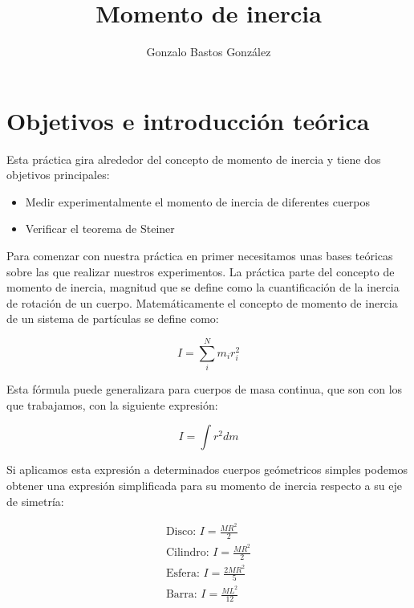 \documentclass[a4paper,12pt,titlepage]{article}
\title{Momento de inercia}
\author{Gonzalo Bastos González}
\begin{document}
\maketitle
\tableofcontents

\newpage

\section{Objetivos e introducción teórica}

Esta práctica gira alrededor del concepto de momento de inercia y tiene dos objetivos principales:

\begin{itemize}
    \item Medir experimentalmente el momento de inercia de diferentes cuerpos
    \item Verificar el teorema de Steiner
\end{itemize}

Para comenzar con nuestra práctica en primer necesitamos unas bases teóricas sobre las que realizar nuestros experimentos. La práctica parte del concepto de momento de inercia, magnitud que se define como la cuantificación de la inercia de rotación de un cuerpo. Matemáticamente el concepto de momento de inercia de un sistema de partículas se define como:

\begin{equation}
    I = \sum_i^N m_i r_i^2
\end{equation}

Esta fórmula puede generalizara para cuerpos de masa continua, que son con los que trabajamos, con la siguiente expresión:

\begin{equation}
    I = \int r^2 dm
    \label{Def MI}
\end{equation}

Si aplicamos esta expresión a determinados cuerpos geómetricos simples podemos obtener una expresión simplificada para su momento de inercia respecto a su eje de simetría:

\begin{equation}
    \begin{gathered}
        \text{Disco: } I=\frac{MR^2}{2} \\
        \text{Cilindro: } I = \frac{MR^2}{2}\\
        \text{Esfera: } I = \frac{2MR^2}{5} \\
        \text{Barra: } I = \frac{ML^2}{12}
        \label{MI cuerpos geometricos}
    \end{gathered}
\end{equation}
\end{document}
